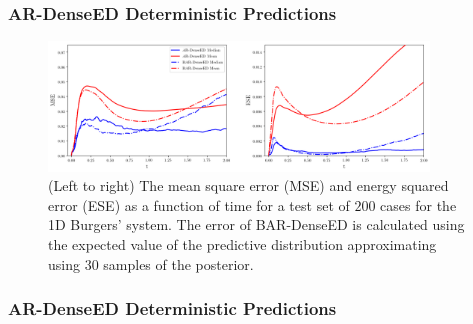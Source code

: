 \documentclass{beamer}
\theoremstyle{remark}
\begin{document}
\begin{frame}
\frametitle{AR-DenseED Deterministic Predictions}
%
\begin{figure}[H]
    \centering
    \includegraphics[width=0.9\textwidth]{Fig11.png}
    \caption{(Left to right) The mean square error (MSE) and energy squared error (ESE) as a function of time for a test set of $200$ cases for the 1D Burgers' system.
    The error of BAR-DenseED is calculated using the expected value of the predictive distribution approximating using $30$ samples of the posterior.}
    \label{fig:burgers1D-MSE}
\end{figure}
\end{frame}

\begin{frame}
\frametitle{AR-DenseED Deterministic Predictions}
\begin{table}[H]
    \caption{Wall-clock time of finite element, finite difference and AR-DenseED to simulate $400$ time-steps of the 1D-Burgers' system.
    Wall-clock time estimates were obtained by averaging $10$ independent simulation run times.}
    \label{tab:burger1d-wallclock}
\end{table}
\end{frame}
\end{document}
